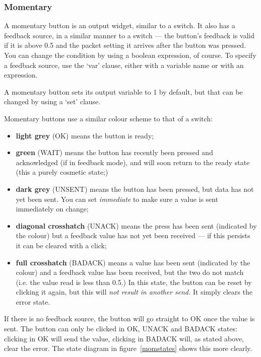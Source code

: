\subsubsection{Momentary}
\label{moms}
A momentary button is an output widget, similar to a switch. It also has a
feedback source, in a similar manner to a switch --- the button's feedback is
valid if it is above 0.5 and the packet setting it arrives after the button
was pressed. You can change the condition by using a boolean expression, of course.
To specify a feedback source, use the `var' clause, either with a variable name
or with an expression.

A momentary button sets its output variable to 1 by default, but that can be changed
by using a `set' clause.

Momentary buttons use a similar colour scheme to that of a switch:
\begin{itemize}
\item \textbf{light grey} (OK) means the button is ready;
\item \textbf{green} (WAIT) means the button has recently been pressed and acknowledged (if in feedback mode),
and will soon return to the ready state (this a purely cosmetic state;)
\item \textbf{dark grey} (UNSENT) means the button has been pressed, but data has not yet been sent. You can set \emph{immediate} to
make sure a value is sent immediately on change;
\item \textbf{diagonal crosshatch} (UNACK) means the press has been sent (indicated by the colour) but a feedback value has
not yet been received --- if this persists it can be cleared with a click;
\item \textbf{full crosshatch} (BADACK) means a value has been sent (indicated by the colour) and a feedback value has
been received, but the two do not match (i.e. the value read is less than 0.5.) In this state, the button can be reset by clicking
it again, but this will \emph{not result in another send.} It simply clears the error state.
\end{itemize}
If there is no feedback source, the button will go straight to OK once the
value is sent. The button can only be clicked in OK, UNACK and BADACK states: clicking in
OK will send the value, clicking in BADACK will, as stated above, clear the error.
The state diagram in figure~\ref{momstates} shows this more clearly.
